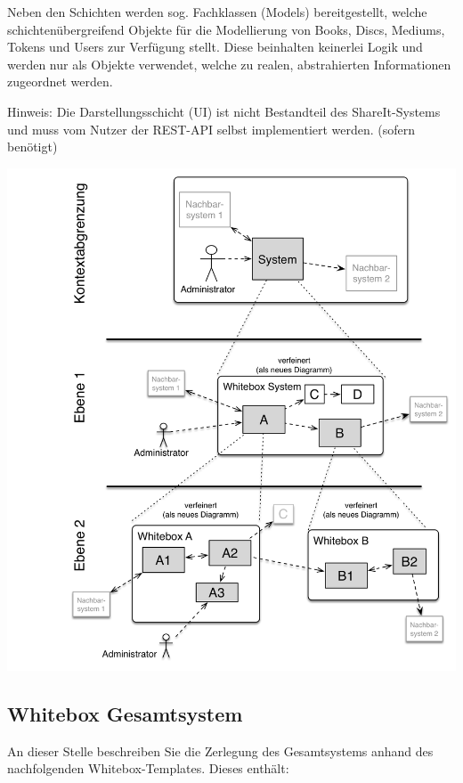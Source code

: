 \documentclass[]{article}
\begin{document}
Neben den Schichten werden sog. Fachklassen (Models) bereitgestellt, welche schichtenübergreifend Objekte für die Modellierung von Books, Discs, Mediums, Tokens und Users zur Verfügung stellt. Diese beinhalten keinerlei Logik und werden nur als Objekte verwendet, welche zu realen, abstrahierten Informationen zugeordnet werden.

Hinweis: Die Darstellungsschicht (UI) ist nicht Bestandteil des ShareIt-Systems und muss vom Nutzer der REST-API selbst implementiert werden. (sofern benötigt)

\includegraphics{images/05_building_blocks-DE.png}

\subsection{Whitebox Gesamtsystem}\label{_whitebox_gesamtsystem}

An dieser Stelle beschreiben Sie die Zerlegung des Gesamtsystems anhand
des nachfolgenden Whitebox-Templates. Dieses enthält:
\end{document}

